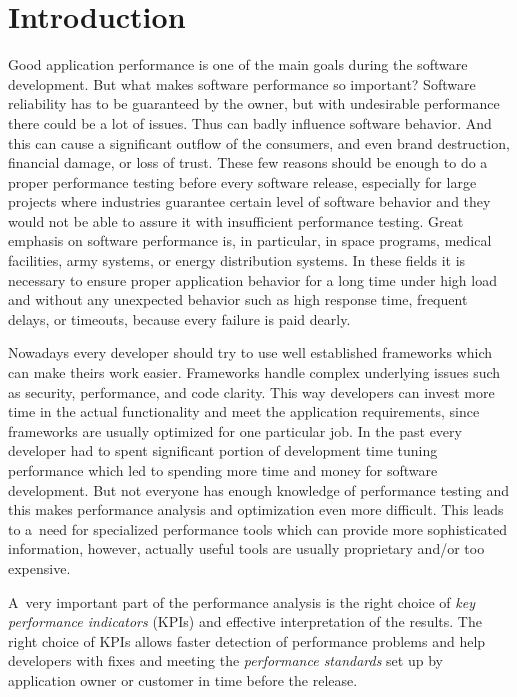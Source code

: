 


\chapter{Introduction}
\label{Introduction}
Good application performance is one of the main goals during the software development. But what makes software performance so important? Software reliability has to be guaranteed by the owner, but with undesirable performance there could be a lot of issues. Thus can badly influence software behavior. And this can cause a significant outflow of the consumers, and even brand destruction, financial damage, or loss of trust. These few reasons should be enough to do a proper performance testing before every software release, especially for large projects where industries guarantee certain level of software behavior and they would not be able to assure it with insufficient performance testing. Great emphasis on software performance is, in particular, in space programs, medical facilities, army systems, or energy distribution systems. In these fields it is necessary to ensure proper application behavior for a long time under high load and without any unexpected behavior such as high response time, frequent delays, or timeouts, because every failure is paid dearly. 

Nowadays every developer should try to use well established frameworks which can make theirs work easier. Frameworks handle complex underlying issues such as security, performance, and code clarity. This way developers can invest more time in the actual functionality and meet the application requirements, since frameworks are usually optimized for one particular job. In the past every developer had to spent significant portion of development time tuning performance which led to spending more time and money for software development. But not everyone has enough knowledge of performance testing and this makes performance analysis and optimization even more difficult. This leads to a~need for specialized performance tools which can provide more sophisticated information, however, actually useful tools are usually proprietary and/or too expensive.

A~very important part of the performance analysis is the right choice of \emph{key performance indicators} (KPIs) \cite{Molyneaux:TAoAPT} and effective interpretation of the results. The right choice of KPIs allows faster detection of performance problems and help developers with fixes and meeting the \emph{performance standards} \cite{Molyneaux:TAoAPT} set up by application owner or customer in time before the release. 

